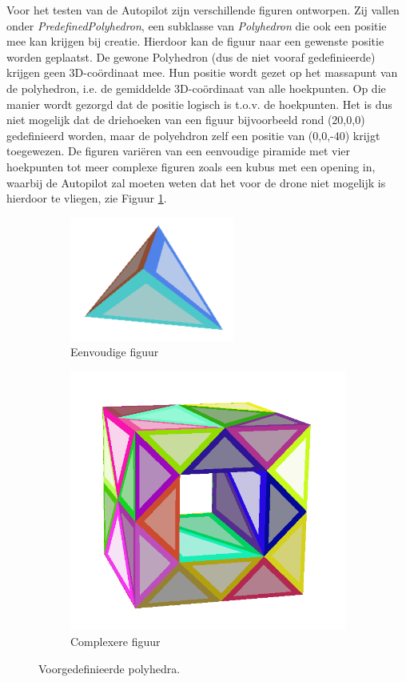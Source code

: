 Voor het testen van de Autopilot zijn verschillende figuren ontworpen. Zij vallen onder \textit{PredefinedPolyhedron}, een subklasse van \textit{Polyhedron} die ook een positie mee kan krijgen bij creatie. Hierdoor kan de figuur naar een gewenste positie worden geplaatst. De gewone Polyhedron (dus de niet vooraf gedefinieerde) krijgen geen 3D-co\"ordinaat mee. Hun positie wordt gezet op het massapunt van de polyhedron, i.e. de gemiddelde 3D-co\"ordinaat van alle hoekpunten. Op die manier wordt gezorgd dat de positie logisch is t.o.v. de hoekpunten. Het is dus niet mogelijk dat de driehoeken van een figuur bijvoorbeeld rond (20,0,0) gedefinieerd worden, maar de polyehdron zelf een positie van (0,0,-40) krijgt toegewezen. De figuren vari\"eren van een eenvoudige piramide met vier hoekpunten tot meer complexe figuren zoals een kubus met een opening in, waarbij de Autopilot zal moeten weten dat het voor de drone niet mogelijk is hierdoor te vliegen, zie Figuur \ref{fig: polyhedra}.

\begin{figure}[H]
	\centering
	\begin{subfigure}{.5\textwidth}
		\centering
		\includegraphics[width=.4\linewidth]{Testbed/4point.png}
		\caption{Eenvoudige figuur}
	\end{subfigure}%
	\begin{subfigure}{.5\textwidth}
		\centering
		\includegraphics[width=.4\linewidth]{Testbed/poly2.png}
		\caption{Complexere figuur}
	\end{subfigure}
	\caption{Voorgedefinieerde polyhedra.}
	\label{fig: polyhedra}
\end{figure}
